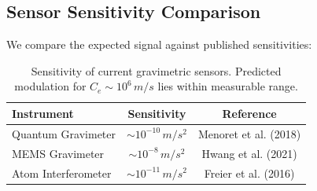 \documentclass[12pt]{article}
\begin{document}
    \subsection*{Sensor Sensitivity Comparison}
    We compare the expected signal against published sensitivities:

    \begin{table}[h!]
        \centering
        \begin{tabular}{|l|c|c|}
            \hline
            \textbf{Instrument} & \textbf{Sensitivity} & \textbf{Reference} \\
            \hline
            Quantum Gravimeter & \( \sim 10^{-10} \, \si{m/s^2} \) & Menoret et al. (2018) \\
            MEMS Gravimeter & \( \sim 10^{-8} \, \si{m/s^2} \) & Hwang et al. (2021) \\
            Atom Interferometer & \( \sim 10^{-11} \, \si{m/s^2} \) & Freier et al. (2016) \\
            \hline
        \end{tabular}
        \caption{Sensitivity of current gravimetric sensors. Predicted modulation for \( C_e \sim 10^6\, \si{m/s} \) lies within measurable range.}
    \end{table}



\ifdefined\standalonechapter\else


\end{document}
